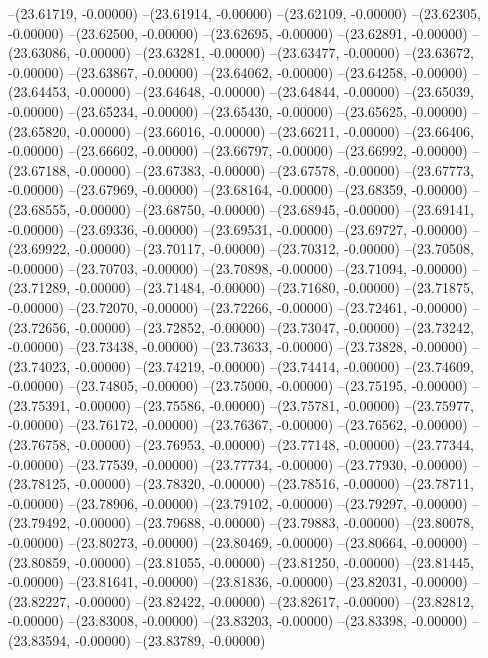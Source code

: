 --(23.61719, -0.00000)
--(23.61914, -0.00000)
--(23.62109, -0.00000)
--(23.62305, -0.00000)
--(23.62500, -0.00000)
--(23.62695, -0.00000)
--(23.62891, -0.00000)
--(23.63086, -0.00000)
--(23.63281, -0.00000)
--(23.63477, -0.00000)
--(23.63672, -0.00000)
--(23.63867, -0.00000)
--(23.64062, -0.00000)
--(23.64258, -0.00000)
--(23.64453, -0.00000)
--(23.64648, -0.00000)
--(23.64844, -0.00000)
--(23.65039, -0.00000)
--(23.65234, -0.00000)
--(23.65430, -0.00000)
--(23.65625, -0.00000)
--(23.65820, -0.00000)
--(23.66016, -0.00000)
--(23.66211, -0.00000)
--(23.66406, -0.00000)
--(23.66602, -0.00000)
--(23.66797, -0.00000)
--(23.66992, -0.00000)
--(23.67188, -0.00000)
--(23.67383, -0.00000)
--(23.67578, -0.00000)
--(23.67773, -0.00000)
--(23.67969, -0.00000)
--(23.68164, -0.00000)
--(23.68359, -0.00000)
--(23.68555, -0.00000)
--(23.68750, -0.00000)
--(23.68945, -0.00000)
--(23.69141, -0.00000)
--(23.69336, -0.00000)
--(23.69531, -0.00000)
--(23.69727, -0.00000)
--(23.69922, -0.00000)
--(23.70117, -0.00000)
--(23.70312, -0.00000)
--(23.70508, -0.00000)
--(23.70703, -0.00000)
--(23.70898, -0.00000)
--(23.71094, -0.00000)
--(23.71289, -0.00000)
--(23.71484, -0.00000)
--(23.71680, -0.00000)
--(23.71875, -0.00000)
--(23.72070, -0.00000)
--(23.72266, -0.00000)
--(23.72461, -0.00000)
--(23.72656, -0.00000)
--(23.72852, -0.00000)
--(23.73047, -0.00000)
--(23.73242, -0.00000)
--(23.73438, -0.00000)
--(23.73633, -0.00000)
--(23.73828, -0.00000)
--(23.74023, -0.00000)
--(23.74219, -0.00000)
--(23.74414, -0.00000)
--(23.74609, -0.00000)
--(23.74805, -0.00000)
--(23.75000, -0.00000)
--(23.75195, -0.00000)
--(23.75391, -0.00000)
--(23.75586, -0.00000)
--(23.75781, -0.00000)
--(23.75977, -0.00000)
--(23.76172, -0.00000)
--(23.76367, -0.00000)
--(23.76562, -0.00000)
--(23.76758, -0.00000)
--(23.76953, -0.00000)
--(23.77148, -0.00000)
--(23.77344, -0.00000)
--(23.77539, -0.00000)
--(23.77734, -0.00000)
--(23.77930, -0.00000)
--(23.78125, -0.00000)
--(23.78320, -0.00000)
--(23.78516, -0.00000)
--(23.78711, -0.00000)
--(23.78906, -0.00000)
--(23.79102, -0.00000)
--(23.79297, -0.00000)
--(23.79492, -0.00000)
--(23.79688, -0.00000)
--(23.79883, -0.00000)
--(23.80078, -0.00000)
--(23.80273, -0.00000)
--(23.80469, -0.00000)
--(23.80664, -0.00000)
--(23.80859, -0.00000)
--(23.81055, -0.00000)
--(23.81250, -0.00000)
--(23.81445, -0.00000)
--(23.81641, -0.00000)
--(23.81836, -0.00000)
--(23.82031, -0.00000)
--(23.82227, -0.00000)
--(23.82422, -0.00000)
--(23.82617, -0.00000)
--(23.82812, -0.00000)
--(23.83008, -0.00000)
--(23.83203, -0.00000)
--(23.83398, -0.00000)
--(23.83594, -0.00000)
--(23.83789, -0.00000)
